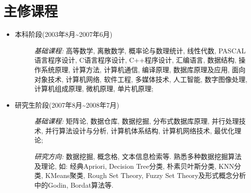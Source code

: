 \documentclass[a4paper,10pt,english]{manual}
\begin{document}
\section{主修课程}
\begin{itemize}
\item {} \begin{description}
\item[本科阶段(2003年8月\textasciitilde{}2007年6月)]
\emph{基础课程:} 高等数学, 离散数学, 概率论与数理统计, 线性代数, PASCAL语言程序设计, C语言程序设计, C++程序设计, 汇编语言, 数据结构, 操作系统原理, 计算方法, 计算机通信, 编译原理, 数据库原理及应用, 面向对象技术, 计算机网络, 软件工程, 多媒体技术, 人工智能, 数字图像处理, 计算机组成原理, 微机原理, 单片机原理;

\end{description}

\item {} \begin{description}
\item[研究生阶段(2007年8月\textasciitilde{}2008年7月)]
\emph{基础课程:} 矩阵论, 数据仓库, 数据挖掘, 分布式数据库原理, 并行处理技术, 并行算法设计与分析, 计算机体系结构, 计算机网络技术, 最优化理论;

\emph{研究方向:} 数据挖掘, 概念格, 文本信息检索等. 熟悉多种数据挖掘算法及理论, 如: 经典Apriori, Decision Tree分类, 朴素贝叶斯分类, KNN分类, KMeans聚类, Rough Set Theory, Fuzzy Set Theory及形式概念分析中的Godin, Bordat算法等.

\end{description}

\end{itemize}
\end{document}
